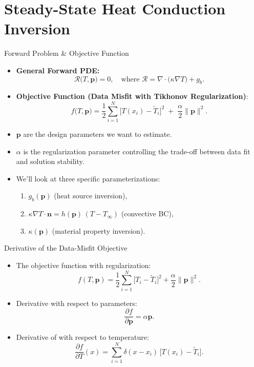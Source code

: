 \documentclass[10pt,aspectratio=169]{beamer}
\begin{document}
\section{Steady-State Heat Conduction Inversion}
\begin{frame}{Forward Problem \& Objective Function}
\small
\begin{itemize}
    \item \textbf{General Forward PDE:}
      \[
        \mathcal{R}\bigl(T,\mathbf{p}\bigr) 
        = 0,
        \quad\text{where } 
        \mathcal{R}
        = \nabla \cdot \bigl(\kappa\nabla T\bigr) + g_b.
      \]
    \item \textbf{Objective Function (Data Misfit with Tikhonov Regularization)}:
      \[
        f\bigl(T,\mathbf{p}\bigr)
        = \frac12 \sum_{i=1}^{N} \bigl[T(x_i) - \widetilde{T}_i\bigr]^2
        \;+\; \frac{\alpha}{2} \|\mathbf{p}\|^2.
      \]
    \item \(\mathbf{p}\) are the design  parameters we want to estimate.
    \item \(\alpha\) is the regularization parameter controlling the trade-off between data fit and solution stability.
    \item We'll look at three specific parameterizations:
      \begin{enumerate}
        \item \(g_b(\mathbf{p})\) (heat source inversion),
        \item \(\kappa\nabla T \cdot \mathbf{n} = h(\mathbf{p})\,(T - T_\infty)\) (convective BC),
        \item \(\kappa(\mathbf{p})\) (material property inversion).
      \end{enumerate}
\end{itemize}
\end{frame}
\begin{frame}{Derivative of the Data-Misfit Objective}
\small
\begin{itemize}

    \item The objective function with regularization:
      \[
        f(T,\mathbf{p}) = \frac12 \sum_{i=1}^N \bigl[T_i - \widetilde{T}_i\bigr]^2 + \frac{\alpha}{2} \|\mathbf{p}\|^2.
      \]
    \item Derivative with respect to parameters:
      \[
        \frac{\partial f}{\partial \mathbf{p}} = \alpha \mathbf{p}.
      \]
    \item Derivative of with respect to temperature:
      \[
        \frac{\partial f}{\partial T}(x) 
        = \sum_{i=1}^N \delta(x - x_i)\,\bigl[T(x_i) - \widetilde{T}_i\bigr].
      \]
 	\end{itemize}
\end{frame}
\end{document}
